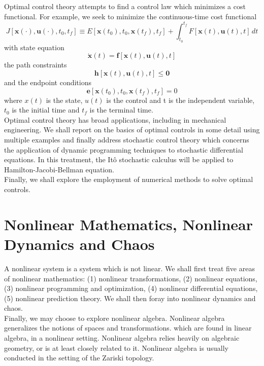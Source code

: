 \documentclass[11pt]{report}
\begin{document}
Optimal control theory attempts to find a control law which minimizes a cost functional. For example, we seek to minimize the continuous-time cost functional
\begin{equation}
	J[\mathbf{x}(\cdot),\mathbf{u}(\cdot),t_0,t_f]{\equiv}E[\mathbf{x}(t_0),t_0,\mathbf{x}(t_f),t_f]+\int_{t_0}^{t_f}{F[\mathbf{x}(t),\mathbf{u}(t),t]\,dt}
\end{equation}
with state equation
\begin{equation}
	\dot{\mathbf{x}}(t)=\mathbf{f}[\mathbf{x}(t),\mathbf{u}(t),t]
\end{equation}
the path constraints
\begin{equation}
	\mathbf{h}[\mathbf{x}(t),\mathbf{u}(t),t]\leq\mathbf{0}
\end{equation}
and the endpoint conditions
\begin{equation}
	\mathbf{e}[\mathbf{x}(t_0),t_0,\mathbf{x}(t_f),t_f]=0
\end{equation}
where $x(t)$ is the state, $u(t)$ is the control and t is the independent variable, $t_0$ is the initial time and $t_f$ is the terminal time.\\
Optimal control theory has broad applications, including in mechanical engineering. We shall report on  the basics of optimal controls in some detail using multiple examples and finally address stochastic control theory which concerns the application of dynamic programming techniques to stochastic differential equations. In this treatment, the Itô stochastic calculus will be applied to Hamilton-Jacobi-Bellman equation.\\
Finally, we shall explore the employment of numerical methods to solve optimal controls.

\chapter{Nonlinear Mathematics, Nonlinear Dynamics and Chaos}

A nonlinear system is a system which is not linear. We shall first treat five areas of nonlinear mathematics: (1) nonlinear transformations, (2) nonlinear equations, (3) nonlinear programming and optimization, (4) nonlinear differential equations, (5) nonlinear prediction theory. We shall then foray into nonlinear dynamics and chaos.\\
Finally, we may choose to explore nonlinear algebra. Nonlinear algebra generalizes the notions of spaces and transformations. which are found in linear algebra, in a nonlinear setting. Nonlinear algebra relies  heavily on algebraic geometry, or is at least closely related to it. Nonlinear algebra is usually conducted in the setting of the Zariski topology.
\end{document}

